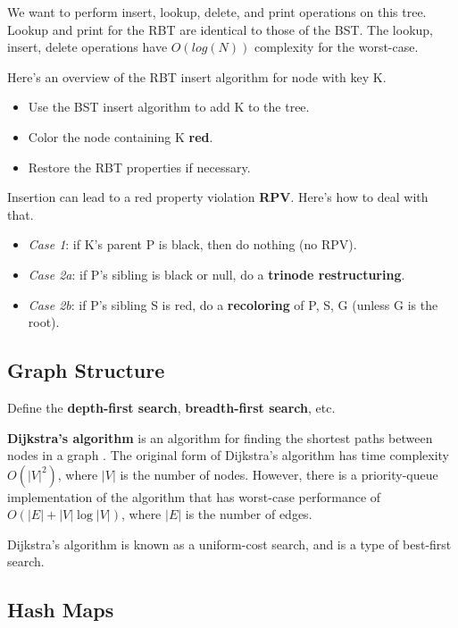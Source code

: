 We want to perform insert, lookup, delete, and print operations on this tree. Lookup and print for the RBT are identical to those of the BST. The lookup, insert, delete operations have $O(log(N))$ complexity for the worst-case. 

Here's an overview of the RBT insert algorithm for node with key K. 

\begin{itemize}
	\item Use the BST insert algorithm to add K to the tree.
	\item Color the node containing K \textbf{red}.
	\item Restore the RBT properties if necessary.
\end{itemize}

Insertion can lead to a red property violation \textbf{RPV}. Here's how to deal with that. 

\begin{itemize}
	\item \textit{Case 1}: if K's parent P is black, then do nothing (no RPV). 
	\item \textit{Case 2a}: if P's sibling is black or null, do a \textbf{trinode restructuring}. 
	\item \textit{Case 2b}: if P's sibling S is red, do a \textbf{recoloring} of P, S, G (unless G is the root). 
\end{itemize}


\subsection{Graph Structure}

Define the \textbf{depth-first search}, \textbf{breadth-first search}, etc.

\textbf{Dijkstra's algorithm} is an algorithm for finding the shortest paths between nodes in a graph \cite{DijkstraAlgorithm}. The original form of Dijkstra's algorithm has time complexity $O(|V|^{2})$, where $|V|$ is the number of nodes. However, there is a priority-queue implementation of the algorithm that has worst-case performance of $O(|E|+|V| \log |V|)$, where $|E|$ is the number of edges. 

Dijkstra's algorithm is known as a uniform-cost search, and is a type of best-first search. 

\subsection{Hash Maps}

